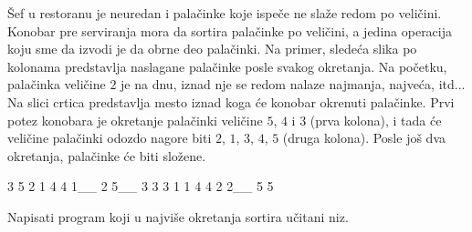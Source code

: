 \begin{Exercise}[difficulty=2, label=516]
  Šef u restoranu je neuredan i palačinke koje ispeče ne slaže redom
  po veličini. Konobar pre serviranja mora da sortira palačinke po
  veličini, a jedina operacija koju sme da izvodi je da obrne deo
  palačinki. Na primer, sledeća slika po kolonama predstavlja
  naslagane palačinke posle svakog okretanja. Na početku, palačinka
  veličine $2$ je na dnu, iznad nje se redom nalaze najmanja, najveća,
  itd... Na slici crtica predstavlja mesto iznad koga će konobar
  okrenuti palačinke. Prvi potez konobara je okretanje palačinki
  veličine $5$, $4$ i $3$ (prva kolona), i tada će veličine palačinki
  odozdo nagore biti $2$, $1$, $3$, $4$, $5$ (druga kolona). Posle još
  dva okretanja, palačinke će biti složene.
\begin{ckod}
    3    5    2    1
    4    4    1__  2
    5__  3    3    3
    1    1    4    4
    2    2__  5    5
\end{ckod}
Napisati program koji u najviše  okretanja sortira učitani
niz. 
    
\end{Exercise}

